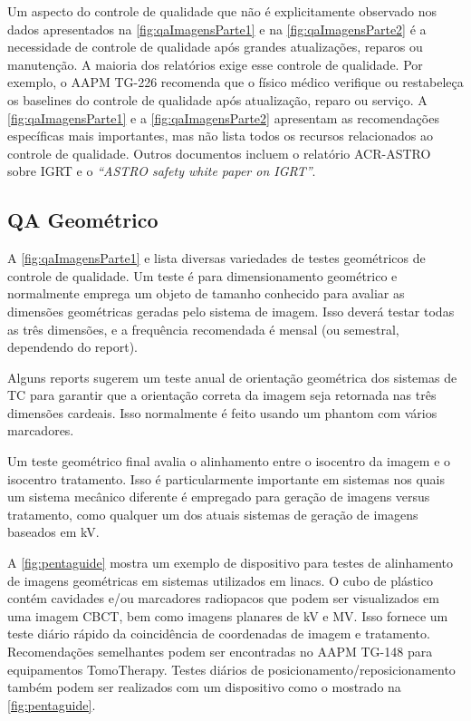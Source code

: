\documentclass[11pt,a4paper]{article}
\newcounter{exemplo}
\begin{document}
    Um aspecto do controle de qualidade que não é explicitamente observado nos dados apresentados na \ref{fig:qaImagensParte1} e na \ref{fig:qaImagensParte2} é a necessidade de controle de qualidade após grandes atualizações, reparos ou manutenção. A maioria dos relatórios exige esse controle de qualidade. Por exemplo, o AAPM TG-226 recomenda que o físico médico verifique ou restabeleça os baselines do controle de qualidade após atualização, reparo ou serviço. A \ref{fig:qaImagensParte1} e a \ref{fig:qaImagensParte2} apresentam as recomendações específicas mais importantes, mas não lista todos os recursos relacionados ao controle de qualidade. Outros documentos incluem o relatório ACR-ASTRO sobre IGRT e o \textit{``ASTRO safety white paper on IGRT''}.

    
    
    
\subsection*{QA Geométrico}

    A \ref{fig:qaImagensParte1} e  lista diversas variedades de testes geométricos de controle de qualidade. Um teste é para dimensionamento geométrico e normalmente emprega um objeto de tamanho conhecido para avaliar as dimensões geométricas geradas pelo sistema de imagem. Isso deverá testar todas as três dimensões, e a frequência recomendada é mensal (ou semestral, dependendo do report). 
    
    Alguns reports sugerem um teste anual de orientação geométrica dos sistemas de TC para garantir que a orientação correta da imagem seja retornada nas três dimensões cardeais. Isso normalmente é feito usando um phantom com vários marcadores. 
    
    Um teste geométrico final avalia o alinhamento entre o isocentro da imagem e o isocentro tratamento. Isso é particularmente importante em sistemas nos quais um sistema mecânico diferente é empregado para geração de imagens versus tratamento, como qualquer um dos atuais sistemas de geração de imagens baseados em kV. 

    A \ref{fig:pentaguide} mostra um exemplo de dispositivo para testes de alinhamento de imagens geométricas em sistemas utilizados em linacs. O cubo de plástico contém cavidades e/ou marcadores radiopacos que podem ser visualizados em uma imagem CBCT, bem como imagens planares de kV e MV. Isso fornece um teste diário rápido da coincidência de coordenadas de imagem e tratamento. Recomendações semelhantes podem ser encontradas no AAPM TG-148 para equipamentos TomoTherapy. Testes diários de posicionamento/reposicionamento também podem ser realizados com um dispositivo como o mostrado na \ref{fig:pentaguide}. 
    
\end{document}
